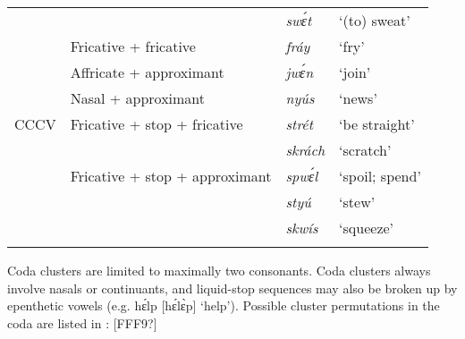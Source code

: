 \begin{table}
\begin{tabularx}{\textwidth}{lX lX}
&  & \itshape swɛ́t & ‘(to) sweat’\\
& Fricative + fricative & \itshape fráy & ‘fry’\\
& Affricate + approximant & \itshape jwɛ́n & ‘join’\\
& Nasal + approximant & \itshape nyús & ‘news’\\
CCCV & Fricative + stop + fricative & \itshape strét & ‘be straight’\\
&  & \itshape skrách & ‘scratch’\\
& Fricative + stop + approximant & \itshape spwɛ́l & ‘spoil; spend’\\
&  & \itshape styú & ‘stew’\\
&  & \itshape skwís & ‘squeeze’\\
\lspbottomrule
\end{tabularx}
\end{table}
Coda clusters are limited to maximally two consonants. Coda clusters always involve nasals or continuants, and liquid-stop sequences may also be broken up by epenthetic vowels (e.g. hɛ́lp [hɛ́lɛ̀p] ‘help’). Possible cluster permutations in the coda are listed in : [FFF9?]

